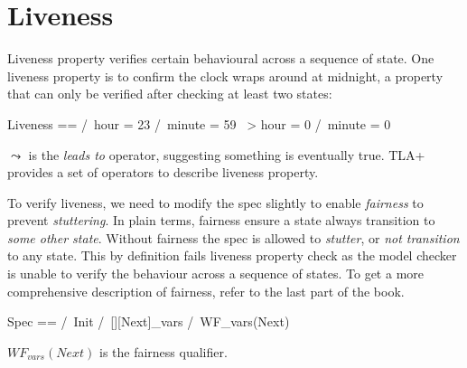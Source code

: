 \section{Liveness}

Liveness property verifies certain behavioural across a sequence of state. One
liveness property is to confirm the clock wraps around at midnight, a property
that can only be verified after checking at least two states: \newline

\begin{tla}
    Liveness ==
        /\ hour = 23 /\ minute = 59 ~> hour = 0 /\ minute = 0
\end{tla}
\begin{tlatex}
%
\end{tlatex}
\newline

$\leadsto$ is the \textit{leads to} operator, suggesting something is eventually
true. TLA+ provides a set of operators to describe liveness property.\newline 

To verify liveness, we need to modify the spec slightly to enable
\textit{fairness} to prevent \textit{stuttering}. In plain terms, fairness
ensure a state always transition to \textit{some other state}. Without fairness
the spec is allowed to \textit{stutter}, or \textit{not transition} to any state. 
This by definition fails liveness property check as the model checker is
unable to verify the behaviour across a sequence of states. To get a more 
comprehensive description of fairness, refer to the last part of the
book.\newline

\begin{tla}
    Spec ==
        /\ Init
        /\ [][Next]_vars
        /\ WF_vars(Next)
\end{tla}
\begin{tlatex}
%
%
%
%
\end{tlatex}
\newline

$WF_{vars}(Next)$ is the fairness qualifier.


